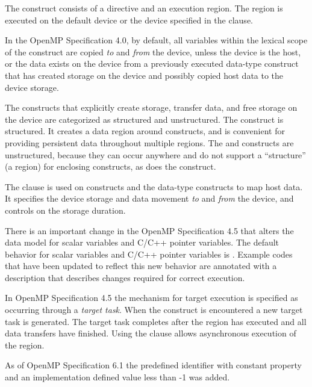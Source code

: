 \label{chap:devices}

The  construct consists of a  directive 
and an execution region. The  region is executed on
the default device or the device specified in the  
clause. 

In the OpenMP Specification 4.0, by default, all variables within the lexical
scope of the construct are copied \emph{to} and \emph{from} the
device, unless the device is the host, or the data exists on the
device from a previously executed data-type construct that
has created storage on the device and possibly copied host
data to the device storage.

The constructs that explicitly
create storage, transfer data, and free storage on the device
are categorized as structured and unstructured. The
 construct is structured. It creates
a data region around  constructs, and is
convenient for providing persistent data throughout multiple
 regions. The  and 
 constructs are unstructured, because 
they can occur anywhere and do not support a ``structure''
(a region) for enclosing  constructs, as does the
 construct. 

The  clause is used on  
constructs and the data-type constructs to map host data. It 
specifies the device storage and data movement \emph{to} and \emph{from} the
device, and controls on the storage duration.

There is an important change in the OpenMP Specification 4.5
that alters the data model for scalar variables and C/C++ pointer variables.
The default behavior for scalar variables and C/C++ pointer variables
is . Example
codes that have been updated to reflect this new behavior are
annotated with a description that describes changes required
for correct execution.

In OpenMP Specification 4.5 the mechanism for target
execution is specified as occurring through a \emph{target task}.
When the  construct is encountered a new 
target task is generated. The target task 
completes after the  region has executed and all data 
transfers have finished. Using the  clause allows asynchronous
execution of the  region.

As of OpenMP Specification 6.1 the  predefined identifier with constant property and an implementation defined value less than -1 was added. 


